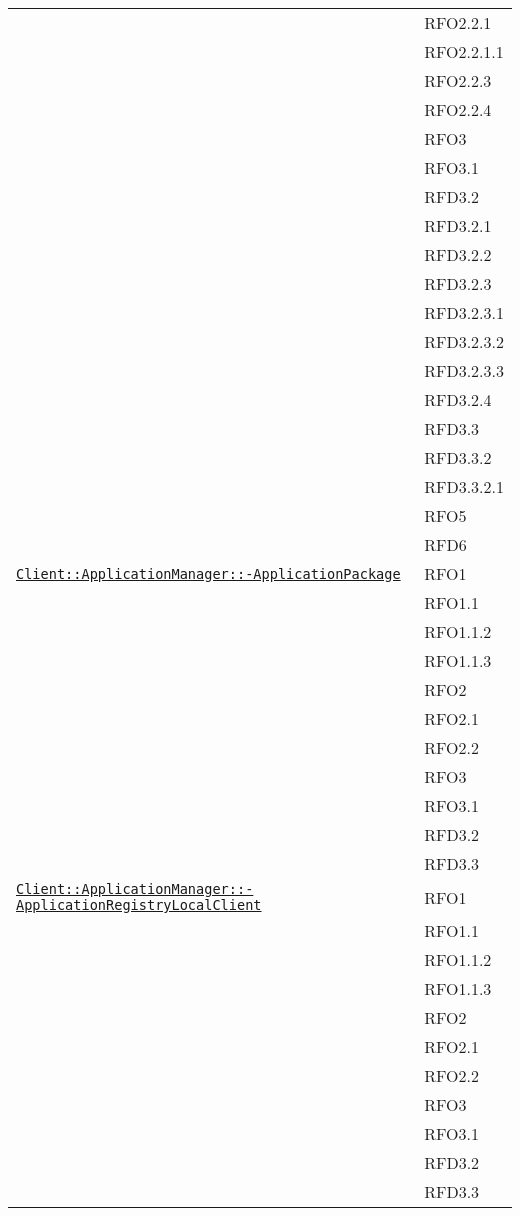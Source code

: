 \begin{longtable}{|>{\centering}m{10cm}|m{3cm}<{\centering}|}
& RFO2.2.1\\
& RFO2.2.1.1\\
& RFO2.2.3\\
& RFO2.2.4\\
& RFO3\\
& RFO3.1\\
& RFD3.2\\
& RFD3.2.1\\
& RFD3.2.2\\
& RFD3.2.3\\
& RFD3.2.3.1\\
& RFD3.2.3.2\\
& RFD3.2.3.3\\
& RFD3.2.4\\
& RFD3.3\\
& RFD3.3.2\\
& RFD3.3.2.1\\
& RFO5\\
& RFD6\\ \hline

\hyperref[Client::ApplicationManager::ApplicationPackage]{\texttt{Client::ApplicationManager::-\linebreak ApplicationPackage}} & RFO1\\
& RFO1.1\\
& RFO1.1.2\\
& RFO1.1.3\\
& RFO2\\
& RFO2.1\\
& RFO2.2\\
& RFO3\\
& RFO3.1\\
& RFD3.2\\
& RFD3.3\\ \hline

\hyperref[Client::ApplicationManager::ApplicationRegistryLocalClient]{\texttt{Client::ApplicationManager::-\linebreak ApplicationRegistryLocalClient}} & RFO1\\
& RFO1.1\\
& RFO1.1.2\\
& RFO1.1.3\\
& RFO2\\
& RFO2.1\\
& RFO2.2\\
& RFO3\\
& RFO3.1\\
& RFD3.2\\
& RFD3.3\\ \hline


\end{longtable}
